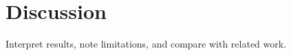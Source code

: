 \chapter{Discussion}
\label{ch:discussion}

Interpret results, note limitations, and compare with related work.
